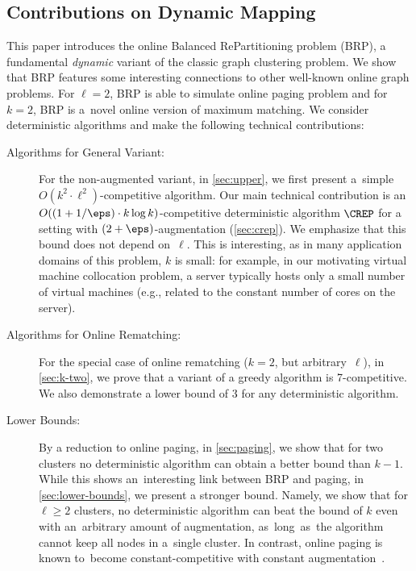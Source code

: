 \subsection{Contributions on Dynamic Mapping}


This paper introduces the online Balanced RePartitioning problem (BRP),
a fundamental \emph{dynamic} variant of the classic graph clustering problem. 
We show that BRP features some interesting connections to other well-known
online graph problems. For $\ell=2$, BRP is able to simulate online paging problem
and for $k=2$, BRP is a~novel online version of maximum matching.
We consider deterministic algorithms and make the following technical
contributions:

\begin{description}

\item[Algorithms for General Variant:]
For the non-augmented variant, in \ref{sec:upper}, we first present a~simple
$O(k^2 \cdot \ell^2)$-competitive algorithm. Our main technical contribution
is an $O((1+1/\eps) \cdot k \log{k})$-competitive deterministic algorithm
$\CREP$ for a setting with $(2+\eps)$-augmentation (\ref{sec:crep}).
We emphasize that this bound does not depend on~$\ell$. This is interesting,
as in many application domains of this problem, $k$ is small: for example, in
our motivating virtual machine collocation problem, a server typically hosts
only a small number of virtual machines (e.g., related to the constant number
of cores on the server).

\item[Algorithms for Online Rematching:]
For the special case of online rematching ($k=2$, but arbitrary~$\ell$), in
\ref{sec:k-two}, we prove that a variant of a greedy algorithm is
7-competitive. We also demonstrate a lower bound of 3 for any deterministic
algorithm.

\item[Lower Bounds:]
By a reduction to online paging, in \ref{sec:paging}, we show that
for two clusters no deterministic algorithm can obtain a better bound than
$k-1$. While this shows an~interesting link between BRP and paging, in
\ref{sec:lower-bounds}, we present a stronger bound. Namely, we
show that for $\ell \geq 2$ clusters, no deterministic algorithm can beat the
bound of $k$ even with an~arbitrary amount of augmentation, as~long~as~the
algorithm cannot keep all nodes in a~single cluster. In contrast, online
paging is known to~become constant-competitive with constant
augmentation~\cite{SleTar85}.

\end{description}




